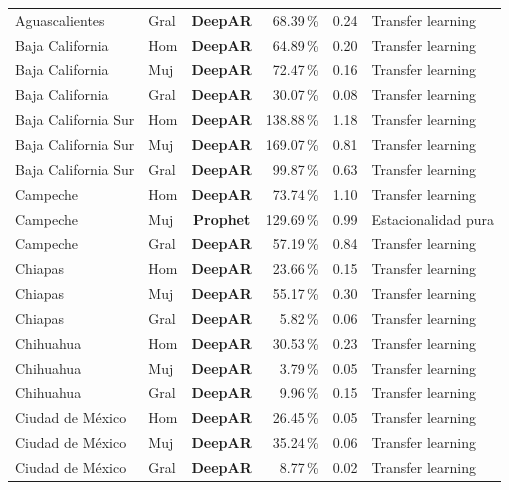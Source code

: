 \documentclass[12pt, letterpaper]{article}
\begin{document}
\begin{longtable}{l l >{\bfseries}c r r l}
Aguascalientes & Gral & \textcolor{cdeepar}{\textbf{DeepAR}} & 68.39\,\% & 0.24 & Transfer learning \\
Baja California & Hom & \textcolor{cdeepar}{\textbf{DeepAR}} & 64.89\,\% & 0.20 & Transfer learning \\
Baja California & Muj & \textcolor{cdeepar}{\textbf{DeepAR}} & 72.47\,\% & 0.16 & Transfer learning \\
Baja California & Gral & \textcolor{cdeepar}{\textbf{DeepAR}} & 30.07\,\% & 0.08 & Transfer learning \\
Baja California Sur & Hom & \textcolor{cdeepar}{\textbf{DeepAR}} & 138.88\,\% & 1.18 & Transfer learning \\
Baja California Sur & Muj & \textcolor{cdeepar}{\textbf{DeepAR}} & 169.07\,\% & 0.81 & Transfer learning \\
Baja California Sur & Gral & \textcolor{cdeepar}{\textbf{DeepAR}} & 99.87\,\% & 0.63 & Transfer learning \\
Campeche & Hom & \textcolor{cdeepar}{\textbf{DeepAR}} & 73.74\,\% & 1.10 & Transfer learning \\
Campeche & Muj & \textcolor{cprophet}{\textbf{Prophet}} & 129.69\,\% & 0.99 & Estacionalidad pura \\
Campeche & Gral & \textcolor{cdeepar}{\textbf{DeepAR}} & 57.19\,\% & 0.84 & Transfer learning \\
Chiapas & Hom & \textcolor{cdeepar}{\textbf{DeepAR}} & 23.66\,\% & 0.15 & Transfer learning \\
Chiapas & Muj & \textcolor{cdeepar}{\textbf{DeepAR}} & 55.17\,\% & 0.30 & Transfer learning \\
Chiapas & Gral & \textcolor{cdeepar}{\textbf{DeepAR}} & 5.82\,\% & 0.06 & Transfer learning \\
Chihuahua & Hom & \textcolor{cdeepar}{\textbf{DeepAR}} & 30.53\,\% & 0.23 & Transfer learning \\
Chihuahua & Muj & \textcolor{cdeepar}{\textbf{DeepAR}} & 3.79\,\% & 0.05 & Transfer learning \\
Chihuahua & Gral & \textcolor{cdeepar}{\textbf{DeepAR}} & 9.96\,\% & 0.15 & Transfer learning \\
Ciudad de México & Hom & \textcolor{cdeepar}{\textbf{DeepAR}} & 26.45\,\% & 0.05 & Transfer learning \\
Ciudad de México & Muj & \textcolor{cdeepar}{\textbf{DeepAR}} & 35.24\,\% & 0.06 & Transfer learning \\
Ciudad de México & Gral & \textcolor{cdeepar}{\textbf{DeepAR}} & 8.77\,\% & 0.02 & Transfer learning \\

\end{longtable}
\end{document}
